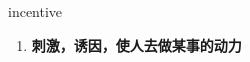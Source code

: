 
\begin{frame}
{\huge incentive}
\begin{center}
\begin{enumerate}\Large
  \item \textbf{刺激，诱因，使人去做某事的动力}
\end{enumerate}
\end{center}
\end{frame}
